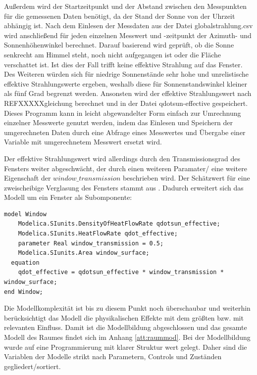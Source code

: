 

Außerdem wird der Startzeitpunkt und der Abstand zwischen den Messpunkten für die gemessenen Daten benötigt, da der Stand der Sonne von der Uhrzeit abhängig ist. Nach dem Einlesen der Messdaten aus der Datei globalstrahlung.csv wird anschließend für jeden einzelnen Messwert und -zeitpunkt der Azimuth- und Sonnenhöhenwinkel berechnet. Darauf basierend wird geprüft, ob die Sonne senkrecht am Himmel steht, noch nicht aufgegangen ist oder die Fläche verschattet ist. Ist dies der Fall trifft keine effektive Strahlung auf das Fenster. Des Weiteren würden sich für niedrige Sonnenstände sehr hohe und unrelistische effektive Strahlungswerte ergeben, weshalb diese für Sonnenstandswinkel kleiner als fünf Grad begrenzt werden.
Ansonsten wird der effektive Strahlungswert nach REFXXXXXgleichung berechnet und in der Datei qdotsun-effective gespeichert. Dieses Programm kann in leicht abgewandelter Form einfach zur Umrechnung einzelner Messwerte genutzt werden, indem das Einlesen und Speichern der umgerechneten Daten durch eine Abfrage eines Messwertes und Übergabe einer Variable mit umgerechnetem Messwert ersetzt wird.

Der effektive Strahlungswert wird allerdings durch den Transmissionsgrad des Fensters weiter abgeschwächt, der durch einen weiteren Paramater/ eine weitere Eigenschaft der $window\_transmission$ beschrieben wird. Der Schätzwert für eine zweischeibige Verglasung des Fensters stammt aus \cite[S.~63]{ha13}. Dadurch erweitert sich das Modell um ein Fenster als Subomponente:

\begin{lstlisting}[language=Modelica, caption={Fenster als Subkomponente des Raummodells},label=lst:raumdrei]
model Window
	Modelica.SIunits.DensityOfHeatFlowRate qdotsun_effective;
	Modelica.SIunits.HeatFlowRate qdot_effective;
	parameter Real window_transmission = 0.5;
	Modelica.SIunits.Area window_surface;
  equation
  	qdot_effective = qdotsun_effective * window_transmission * window_surface;
end Window;
\end{lstlisting}

Die Modellkomplexität ist bis zu diesem Punkt noch überschaubar und weiterhin berücksichtigt das Modell die physikalischen Effekte mit dem größten bzw. mit relevanten Einfluss. Damit ist die Modellbildung abgeschlossen und das gesamte Modell des Raumes findet sich im Anhang \ref{att:raummod}. Bei der Modellbildung wurde auf eine Programmierung mit klarer Struktur wert gelegt. Daher sind die Variablen der Modelle strikt nach Parametern, Controls und Zuständen gegliedert/sortiert.

